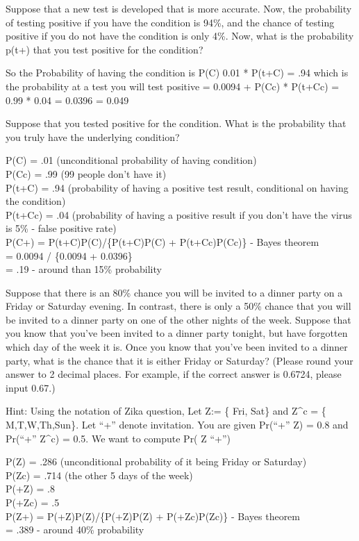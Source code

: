 \documentclass[]{book}
\theoremstyle{definition}
\theoremstyle{definition}
\theoremstyle{definition}
\theoremstyle{remark}
\begin{document}
Suppose that a new test is developed that is more accurate. Now, the
probability of testing positive if you have the condition is 94\%, and
the chance of testing positive if you do not have the condition is only
4\%. Now, what is the probability p(t+) that you test positive for the
condition?

So the Probability of having the condition is P(C) 0.01 *
P(t+\textbar{}C) = .94 which is the probability at a test you will test
positive = 0.0094 + P(Cc) * P(t+\textbar{}Cc) = 0.99 * 0.04 = 0.0396 =
0.049

Suppose that you tested positive for the condition. What is the
probability that you truly have the underlying condition?

P(C) = .01 (unconditional probability of having condition)\\
P(Cc) = .99 (99 people don't have it)\\
P(t+\textbar{}C) = .94 (probability of having a positive test result,
conditional on having the condition)\\
P(t+\textbar{}Cc) = .04 (probability of having a positive result if you
don't have the virus is 5\% - false positive rate)\\
P(C\textbar{}+) = P(t+\textbar{}C)P(C)/\{P(t+\textbar{}C)P(C) +
P(t+\textbar{}Cc)P(Cc)\} - Bayes theorem\\
= 0.0094 / \{0.0094 + 0.0396\}\\
= .19 - around than 15\% probability

Suppose that there is an 80\% chance you will be invited to a dinner
party on a Friday or Saturday evening. In contrast, there is only a 50\%
chance that you will be invited to a dinner party on one of the other
nights of the week. Suppose that you know that you've been invited to a
dinner party tonight, but have forgotten which day of the week it is.
Once you know that you've been invited to a dinner party, what is the
chance that it is either Friday or Saturday? (Please round your answer
to 2 decimal places. For example, if the correct answer is 0.6724,
please input 0.67.)

Hint: Using the notation of Zika question, Let Z:= \{ Fri, Sat\} and
Z\^{}c = \{ M,T,W,Th,Sun\}. Let ``+'' denote invitation. You are given
Pr(``+''\textbar{} Z) = 0.8 and Pr(``+''\textbar{} Z\^{}c) = 0.5. We
want to compute Pr( Z \textbar{} ``+'')

P(Z) = .286 (unconditional probability of it being Friday or Saturday)\\
P(Zc) = .714 (the other 5 days of the week)\\
P(+\textbar{}Z) = .8\\
P(+\textbar{}Zc) = .5\\
P(Z\textbar{}+) = P(+\textbar{}Z)P(Z)/\{P(+\textbar{}Z)P(Z) +
P(+\textbar{}Zc)P(Zc)\} - Bayes theorem\\
= .389 - around 40\% probability
\end{document}
